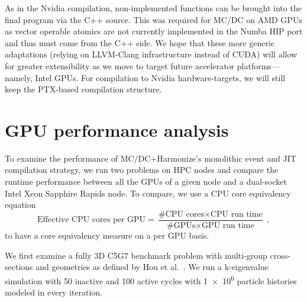 As in the Nvidia compilation, non-implemented functions can be brought into the final program via the C++ source.
This was required for MC/DC on AMD GPUs as vector operable atomics are not currently implemented in the Numba HIP port and thus must come from the C++ side.
We hope that these more generic adaptations (relying on LLVM-Clang infrastructure instead of CUDA) will allow for greater extensibility as we move to target future accelerator platforms---namely, Intel GPUs.
For compilation to Nvidia hardware-targets, we will still keep the PTX-based compilation structure.

\section{GPU performance analysis}

To examine the performance of MC/DC+Harmonize's monolithic event and JIT compilation strategy, we run two problems on HPC nodes and compare the runtime performance between all the GPUs of a given node and a dual-socket Intel Xeon Sapphire Rapids node.
To compare, we use a CPU core equivalency equation
\begin{equation}
    \text{Effective CPU cores per GPU} = \frac{\text{\#CPU cores}\times\text{CPU run time}}{\text{\#GPUs}\times\text{GPU run time}} \; ,
\end{equation}
to have a core equivalency measure on a per GPU basis.

We first examine a fully 3D C5G7 benchmark problem with multi-group cross-sections and geometries as defined by Hou et al.~\cite{jia_hou_oecdnea_2017}.
We run a k-eigenvalue simulation with 50 inactive and 100 active cycles with \num{1e6} particle histories modeled in every iteration.%

